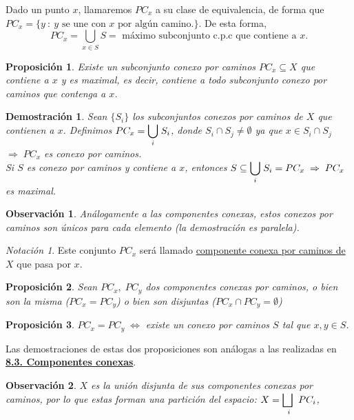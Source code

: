 \documentclass[12pt,twoside]{report}
\theoremstyle{azul}
\newtheorem*{propx}{Proposición}
\newtheorem*{demx}{Demostración}
\theoremstyle{azul2}
\newtheorem*{obsx}{Observación}
\theoremstyle{plain}
\theoremstyle{definition}
\theoremstyle{remark}
\newtheorem*{nota}{Notación}
\begin{document}
Dado un punto $x$, llamaremos $PC_x$ a su clase de equivalencia, de forma que $PC_x = \{y \: : \: y \text{ se une con } x \text{ por algún camino.}\}$. De esta forma, 
$$PC_x=\underset{x \in S}{\bigcup}S=\text{ máximo subconjunto c.p.c que contiene a } x.$$
\begin{propx}
Existe un subconjunto conexo por caminos $PC_x \subseteq X$ que contiene a $x$ y es maximal, es decir, contiene a todo subconjunto conexo por caminos que contenga a $x$.
\end{propx}
\begin{demx}
Sean $\{ S_i \}$ los subconjuntos conexos por caminos de $X$ que contienen a $x$. Definimos $PC_x=\mathlarger{\underset{i}{\bigcup}}\;  S_i$, donde $S_i \cap S_j \neq \emptyset $ ya que $x \in S_i \cap S_j\;$
$\Rightarrow \;PC_x$ es conexo por caminos.\\
Si $S$ es conexo por caminos y contiene a $x$, entonces $S \subseteq \mathlarger{\underset{i}{\bigcup}}\; S_i = PC_x \; \Rightarrow \; PC_x$ es maximal.
\end{demx}

\begin{obsx}
Análogamente a las componentes conexas, estos conexos por caminos son únicos para cada elemento (la demostración es paralela).
\end{obsx}

\begin{nota}
Este conjunto $PC_x$ será llamado \underline{componente conexa por caminos de $X$} que pasa por $x$.
\end{nota}

\begin{propx}
Sean $PC_x, \; PC_y$ dos componentes conexas por caminos, o bien son la misma ($PC_x=PC_y$) o bien son disjuntas ($PC_x \cap PC_y = \emptyset$)
\end{propx}

\begin{propx}
$PC_x = PC_y \; \Leftrightarrow$ existe un conexo por caminos $S$ tal que $x,y \in S$.
\end{propx}

Las demostraciones de estas dos proposiciones son análogas a las realizadas en \textbf{\textcolor{blue}{\hyperref[dempito]{8.3. Componentes conexas}}}.

\begin{obsx}
$X$ es la unión disjunta de sus componentes conexas por caminos, por lo que estas forman una partición del espacio: $X= \underset{i}{\mathlarger{\bigsqcup \;}}\; PC_i$, 
\end{obsx}
\end{document}
